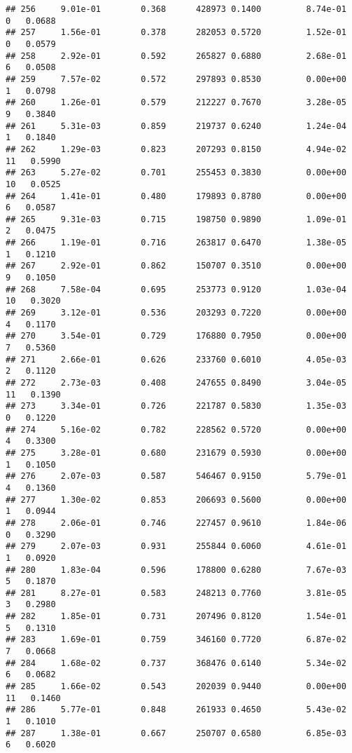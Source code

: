 \documentclass[
]{article}
\begin{document}
\begin{verbatim}
## 256     9.01e-01        0.368      428973 0.1400         8.74e-01   0   0.0688
## 257     1.56e-01        0.378      282053 0.5720         1.52e-01   0   0.0579
## 258     2.92e-01        0.592      265827 0.6880         2.68e-01   6   0.0508
## 259     7.57e-02        0.572      297893 0.8530         0.00e+00   1   0.0798
## 260     1.26e-01        0.579      212227 0.7670         3.28e-05   9   0.3840
## 261     5.31e-03        0.859      219737 0.6240         1.24e-04   1   0.1840
## 262     1.29e-03        0.823      207293 0.8150         4.94e-02  11   0.5990
## 263     5.27e-02        0.701      255453 0.3830         0.00e+00  10   0.0525
## 264     1.41e-01        0.480      179893 0.8780         0.00e+00   6   0.0587
## 265     9.31e-03        0.715      198750 0.9890         1.09e-01   2   0.0475
## 266     1.19e-01        0.716      263817 0.6470         1.38e-05   1   0.1210
## 267     2.92e-01        0.862      150707 0.3510         0.00e+00   9   0.1050
## 268     7.58e-04        0.695      253773 0.9120         1.03e-04  10   0.3020
## 269     3.12e-01        0.536      203293 0.7220         0.00e+00   4   0.1170
## 270     3.54e-01        0.729      176880 0.7950         0.00e+00   7   0.5360
## 271     2.66e-01        0.626      233760 0.6010         4.05e-03   2   0.1120
## 272     2.73e-03        0.408      247655 0.8490         3.04e-05  11   0.1390
## 273     3.34e-01        0.726      221787 0.5830         1.35e-03   0   0.1220
## 274     5.16e-02        0.782      228562 0.5720         0.00e+00   4   0.3300
## 275     3.28e-01        0.680      231679 0.5930         0.00e+00   1   0.1050
## 276     2.07e-03        0.587      546467 0.9150         5.79e-01   4   0.1360
## 277     1.30e-02        0.853      206693 0.5600         0.00e+00   1   0.0944
## 278     2.06e-01        0.746      227457 0.9610         1.84e-06   0   0.3290
## 279     2.07e-03        0.931      255844 0.6060         4.61e-01   1   0.0920
## 280     1.83e-04        0.596      178800 0.6280         7.67e-03   5   0.1870
## 281     8.27e-01        0.583      248213 0.7760         3.81e-05   3   0.2980
## 282     1.85e-01        0.731      207496 0.8120         1.54e-01   5   0.1310
## 283     1.69e-01        0.759      346160 0.7720         6.87e-02   7   0.0668
## 284     1.68e-02        0.737      368476 0.6140         5.34e-02   6   0.0682
## 285     1.66e-02        0.543      202039 0.9440         0.00e+00  11   0.1460
## 286     5.77e-01        0.848      261933 0.4650         5.43e-02   1   0.1010
## 287     1.38e-01        0.667      250707 0.6580         6.85e-03   6   0.6020

\end{verbatim}
\end{document}
